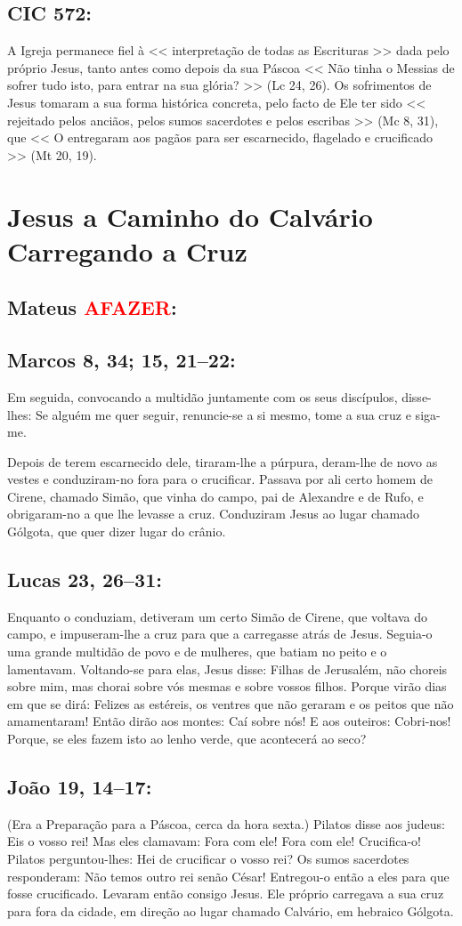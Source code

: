 \documentclass[10pt,a5paper]{book}
\newcommand{\from}[1]{\subsection*{#1}}
\newcommand{\TODO}{\textcolor{red}{\ttfamily AFAZER}}
\begin{document}
\from{CIC 572:}

A Igreja permanece fiel à << interpretação de todas as Escrituras >> dada pelo próprio Jesus, tanto antes como depois da sua Páscoa << Não tinha o Messias de sofrer tudo isto, para entrar na sua glória? >> (Lc 24, 26).
Os sofrimentos de Jesus tomaram a sua forma histórica concreta, pelo facto de Ele ter sido << rejeitado pelos anciãos, pelos sumos sacerdotes e pelos escribas >> (Mc 8, 31), que << O entregaram aos pagãos para ser escarnecido, flagelado e crucificado >> (Mt 20, 19).


\section{Jesus a Caminho do Calvário Carregando a Cruz}

\from{Mateus \TODO:}

\from{Marcos 8, 34; 15, 21--22:}

Em seguida, convocando a multidão juntamente com os seus discípulos, disse-lhes:
Se alguém me quer seguir, renuncie-se a si mesmo, tome a sua cruz e siga-me.

Depois de terem escarnecido dele, tiraram-lhe a púrpura, deram-lhe de novo as vestes e conduziram-no fora para o crucificar.
Passava por ali certo homem de Cirene, chamado Simão, que vinha do campo, pai de Alexandre e de Rufo, e obrigaram-no a que lhe levasse a cruz.
Conduziram Jesus ao lugar chamado Gólgota, que quer dizer lugar do crânio.

\from{Lucas 23, 26--31:}

Enquanto o conduziam, detiveram um certo Simão de Cirene, que voltava do campo, e impuseram-lhe a cruz para que a carregasse atrás de Jesus.
Seguia-o uma grande multidão de povo e de mulheres, que batiam no peito e o lamentavam.
Voltando-se para elas, Jesus disse:
Filhas de Jerusalém, não choreis sobre mim, mas chorai sobre vós mesmas e sobre vossos filhos.
Porque virão dias em que se dirá:
Felizes as estéreis, os ventres que não geraram e os peitos que não amamentaram!
Então dirão aos montes:
Caí sobre nós! E aos outeiros:
Cobri-nos!
Porque, se eles fazem isto ao lenho verde, que acontecerá ao seco?

\from{João 19, 14--17:}

(Era a Preparação para a Páscoa, cerca da hora sexta.)
Pilatos disse aos judeus:
Eis o vosso rei!
Mas eles clamavam:
Fora com ele! Fora com ele! Crucifica-o! Pilatos perguntou-lhes:
Hei de crucificar o vosso rei? Os sumos sacerdotes responderam:
Não temos outro rei senão César!
Entregou-o então a eles para que fosse crucificado.
Levaram então consigo Jesus.
Ele próprio carregava a sua cruz para fora da cidade, em direção ao lugar chamado Calvário, em hebraico Gólgota.
\end{document}
